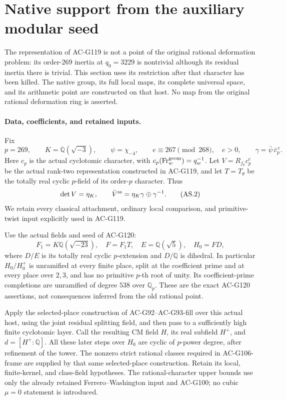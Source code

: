 \section{Native support from the auxiliary modular seed}
\label{sec:cubic-auxiliary-native-support}

The representation of AC-G119 is not a point of the original rational
deformation problem: its order-\(269\) inertia at \(q_0=3229\) is
nontrivial although its residual inertia there is trivial.  This
section uses its restriction after that character has been killed.
The native group, its full local maps, its complete universal space,
and its arithmetic point are constructed on that host.  No map
from the original rational deformation ring is asserted.

\paragraph{Data, coefficients, and retained inputs.}
Fix
\[
 p=269,\qquad K=\mathbb Q(\sqrt{-3}),\qquad
 \psi=\chi_{-4},\qquad e\equiv267\pmod {268},\quad e>0,
 \qquad \gamma=\bar\psi\,\bar c_p^{\,e}.
 \tag{AS.1}
\]
Here \(c_p\) is the actual cyclotomic character, with
\(c_p(\operatorname{Fr}^{\rm geom}_w)=q_w^{-1}\).
Let \(V=R_{f_0}c_p^e\) be the actual rank-two representation
constructed in AC-G119, and let \(T=T_\theta\) be the totally
real cyclic \(p\)-field of its order-\(p\) character.
Thus
\[
 \det V=\eta_K,\qquad
 \bar V^{\rm ss}=\eta_K\gamma\oplus\gamma^{-1}.
 \tag{AS.2}
\]
We retain every classical attachment, ordinary local comparison,
and primitive-twist input explicitly used in AC-G119.

Use the actual fields and seed of AC-G120:
\[
 F_1=K\mathbb Q(\sqrt{-23}),\quad F=F_1T,\quad
 E=\mathbb Q(\sqrt5),\quad H_0=FD,
 \tag{AS.3}
\]
where \(D/E\) is its totally real cyclic \(p\)-extension and
\(D/\mathbb Q\) is dihedral.  In particular \(H_0/H_0^+\)
is unramified at every finite place, split at the coefficient
prime and at every place over \(2,3\), and has no primitive
\(p\)-th root of unity.  Its coefficient-prime completions
are unramified of degree \(538\) over \(\mathbb Q_p\).
These are the exact AC-G120 assertions, not consequences
inferred from the old rational point.

Apply the selected-place construction of AC-G92--AC-G93-fill
over this actual host, using the joint residual splitting field,
and then pass to a sufficiently high finite cyclotomic layer.
Call the resulting CM field \(H\), its real subfield \(H^+\),
and \(d=[H^+:\mathbb Q]\).  All these later steps over \(H_0\)
are cyclic of \(p\)-power degree, after refinement of the tower.
The nonzero strict rational classes required in AC-G106-frame
are supplied by that same selected-place construction.
Retain its local, finite-kernel, and class-field hypotheses.
The rational-character upper bounds use only the already retained
Ferrero--Washington input and AC-G100; no cubic \(\mu=0\)
statement is introduced.

